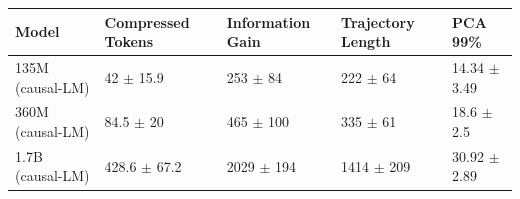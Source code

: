 \begin{tabular}{lllll}
\toprule
 Model            & Compressed Tokens         & Information Gain        & Trajectory Length       & PCA 99\%                   \\
\midrule
 135M (causal-LM) & 42 {\small $\pm$ 15.9}    & 253 {\small $\pm$ 84}   & 222 {\small $\pm$ 64}   & 14.34 {\small $\pm$ 3.49} \\
 \midrule
 360M (causal-LM) & 84.5 {\small $\pm$ 20}    & 465 {\small $\pm$ 100}  & 335 {\small $\pm$ 61}   & 18.6 {\small $\pm$ 2.5}   \\
 \midrule
 1.7B (causal-LM) & 428.6 {\small $\pm$ 67.2} & 2029 {\small $\pm$ 194} & 1414 {\small $\pm$ 209} & 30.92 {\small $\pm$ 2.89} \\
\bottomrule
\end{tabular}
